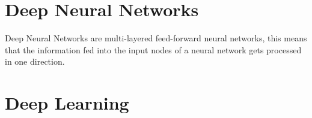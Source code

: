 \section{Deep Neural Networks}
Deep Neural Networks are multi-layered feed-forward neural networks, this means that the information fed into the input nodes of a neural network gets processed in one direction.



\Blindtext[4][1]

\section{Deep Learning}
\Blindtext[4][1]
